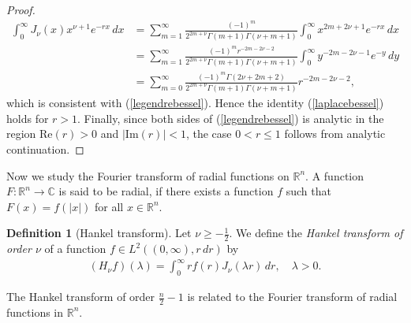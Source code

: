 \documentclass{article}
\numberwithin{equation}{section}
\newcommand{\bbC}{\mathbb{C}}
\newcommand{\bbR}{\mathbb{R}}
\renewcommand{\Re}{\mathrm{Re}}
\renewcommand{\Im}{\mathrm{Im}}
\theoremstyle{plain}
\theoremstyle{definition}
\newtheorem{definition}[theorem]{Definition}
\begin{document}
\begin{proof}
\begin{align*}
\int_0^\infty J_\nu(x)x^{\nu+1}e^{-rx}\,dx&=\sum_{m=1}^\infty \frac{(-1)^m}{2^{2m+\nu}\Gamma(m+1)\Gamma\left(\nu+m+1\right)}\int_0^\infty x^{2m+2\nu+1}e^{-rx}\,dx\\
&=\sum_{m=1}^\infty \frac{(-1)^mr^{-2m-2\nu-2}}{2^{2m+\nu}\Gamma(m+1)\Gamma\left(\nu+m+1\right)}\int_0^\infty y^{-2m-2\nu-1}e^{-y}\,dy\\
&=\sum_{m=0}^\infty\frac{(-1)^m\Gamma\left(2\nu+2m+2\right)}{2^{2m+\nu}\Gamma(m+1)\Gamma\left(\nu+m+1\right)}r^{-2m-2\nu-2},
\end{align*}
which is consistent with (\ref{legendrebessel}). Hence the identity (\ref{laplacebessel}) holds for $r>1$. Finally, since both sides of (\ref{legendrebessel}) is analytic in the region $\Re(r)>0$ and $\vert\Im(r)\vert<1$, the case $0<r\leq 1$ follows from analytic continuation.
\end{proof}

Now we study the Fourier transform of radial functions on $\bbR^n$. A function $F:\bbR^n\to\bbC$ is said to be radial, if there exists a function $f$ such that $F(x)=f(\vert x\vert)$ for all $x\in\bbR^n$.

\begin{definition}[Hankel transform]\label{hankeltransform}
Let $\nu\geq-\frac{1}{2}$. We define the \textit{Hankel transform of order $\nu$} of a function $f\in L^2((0,\infty),r\,dr)$ by
\begin{align*}
	(H_\nu f)(\lambda)=\int_0^\infty rf(r)J_\nu(\lambda r)\,dr,\quad\lambda>0.
\end{align*}
\end{definition}

The Hankel transform of order $\frac{n}{2}-1$ is related to the Fourier transform of radial functions in $\bbR^n$.
\end{document}
